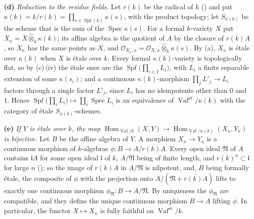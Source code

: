 
\smallskip
\noindent\textbf{(d)}
\label{sga3:VIIB:1.6.C}
\emph{Reduction to the residue fields.} Let \(r(k)\) be the radical of
\(k\) \textup{()} and put
\(\kappa(k)=k/r(k)=\prod_{s\in\operatorname{Spf}(k)}\kappa(s)\), with
the product topology; let \(S_{\kappa(k)}\) be the scheme that is the
sum of the \(\operatorname{Spec}\kappa(s)\). For a formal
\(k\)-variety \(X\) put \(X_\kappa=X\widehat\otimes_k\kappa(k)\); its
affine algebra is the quotient of \(A\) by the closure of \(r(k)A\), so
\(X_\kappa\) has the same points as \(X\), and
\(\mathcal O_{X_\kappa,x}=\mathcal O_{X,x}\widehat\otimes_k\kappa(s)\).
By \textup{(a)}, \(X_\kappa\) is étale over \(\kappa(k)\) when \(X\) is
étale over \(k\). Every formal \(\kappa(k)\)-variety is topologically
flat, so by \textup{(c)}\,\textup{(iv)} the étale ones are the
\(\operatorname{Spf}\bigl(\prod_{i\in I}L_i\bigr)\), with \(L_i\) a
finite separable extension of some \(\kappa(s_i)\); and a continuous
\(\kappa(k)\)-morphism \(\prod_jL'_j\to L_i\) factors through a single
factor \(L'_j\), since \(L_i\) has no idempotents other than \(0\) and
\(1\). Hence
\(\operatorname{Spf}\bigl(\prod_iL_i\bigr)\mapsto\coprod_i\operatorname{Spec}L_i\)
is an equivalence of \(\operatorname{Vaf}^{\mathrm{\acute{e}t}}/\kappa(k)\)
with the category of étale \(S_{\kappa(k)}\)-schemes.

\smallskip
\noindent\textbf{(e)}
\label{sga3:VIIB:1.6.D}
\emph{If \(Y\) is étale over \(k\), the map
\(\operatorname{Hom}_{\operatorname{Vaf}/k}(X,Y)\to
\operatorname{Hom}_{\operatorname{Vaf}/\kappa(k)}(X_\kappa,Y_\kappa)\)
is bijective.} Let \(B\) be the affine algebra of \(Y\). A morphism
\(X_\kappa\to Y_\kappa\) is a continuous morphism of \(k\)-algebras
\(\phi:B\to A/\overline{r(k)A}\). Every open ideal \(\mathfrak N\) of
\(A\) contains \(\mathfrak lA\) for some open ideal \(\mathfrak l\) of
\(k\), \(A/\mathfrak N\) being of finite length, and
\(r(k)^n\subset\mathfrak l\) for large \(n\) \textup{()}; so the
image of \(r(k)A\) in \(A/\mathfrak N\) is nilpotent, and, \(B\) being
formally étale, the composite of \(\phi\) with the projection onto
\(A/(\mathfrak N+\overline{r(k)A})\) lifts to exactly one continuous
morphism \(\phi_{\mathfrak N}:B\to A/\mathfrak N\). By uniqueness the
\(\phi_{\mathfrak N}\) are compatible, and they define the unique
continuous morphism \(B\to A\) lifting \(\phi\). In particular, the
functor \(X\mapsto X_\kappa\) is fully faithful on
\(\operatorname{Vaf}^{\mathrm{\acute{e}t}}/k\).

